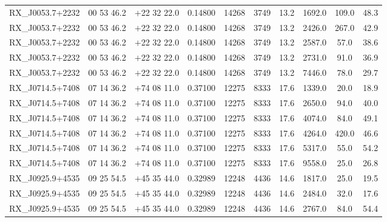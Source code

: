 \begin{landscape}
\begin{center}
\begin{longtable}{l c c c c c c c c c}
RX\_J0053.7+2232  &        00 53 46.2  &         $+$22 32 22.0  &       0.14800  & 14268  &   3749  &       13.2  &      1692.0  &  109.0  &  48.3  \\
RX\_J0053.7+2232  &        00 53 46.2  &         $+$22 32 22.0  &       0.14800  & 14268  &   3749  &       13.2  &      2426.0  &  267.0  &  42.9  \\
RX\_J0053.7+2232  &        00 53 46.2  &         $+$22 32 22.0  &       0.14800  & 14268  &   3749  &       13.2  &      2587.0  &  57.0  &   38.6  \\
RX\_J0053.7+2232  &        00 53 46.2  &         $+$22 32 22.0  &       0.14800  & 14268  &   3749  &       13.2  &      2731.0  &  91.0  &   36.9  \\
RX\_J0053.7+2232  &        00 53 46.2  &         $+$22 32 22.0  &       0.14800  & 14268  &   3749  &       13.2  &      7446.0  &  78.0  &   29.7  \\
RX\_J0714.5+7408  &        07 14 36.2  &         $+$74 08 11.0  &       0.37100  & 12275  &   8333  &       17.6  &      1339.0  &  20.0  &   18.9  \\
RX\_J0714.5+7408  &        07 14 36.2  &         $+$74 08 11.0  &       0.37100  & 12275  &   8333  &       17.6  &      2650.0  &  94.0  &   40.0  \\
RX\_J0714.5+7408  &        07 14 36.2  &         $+$74 08 11.0  &       0.37100  & 12275  &   8333  &       17.6  &      4074.0  &  84.0  &   49.1  \\
RX\_J0714.5+7408  &        07 14 36.2  &         $+$74 08 11.0  &       0.37100  & 12275  &   8333  &       17.6  &      4264.0  &  420.0  &  46.6  \\
RX\_J0714.5+7408  &        07 14 36.2  &         $+$74 08 11.0  &       0.37100  & 12275  &   8333  &       17.6  &      5317.0  &  55.0  &   54.2  \\
RX\_J0714.5+7408  &        07 14 36.2  &         $+$74 08 11.0  &       0.37100  & 12275  &   8333  &       17.6  &      9558.0  &  25.0  &   26.8  \\
RX\_J0925.9+4535  &        09 25 54.5  &         $+$45 35 44.0  &       0.32989  & 12248  &   4436  &       14.6  &      1817.0  &  25.0  &   19.5  \\
RX\_J0925.9+4535  &        09 25 54.5  &         $+$45 35 44.0  &       0.32989  & 12248  &   4436  &       14.6  &      2484.0  &  32.0  &   17.6  \\
RX\_J0925.9+4535  &        09 25 54.5  &         $+$45 35 44.0  &       0.32989  & 12248  &   4436  &       14.6  &      2767.0  &  84.0  &   54.4  \\

\end{longtable}
\end{center}
\end{landscape}
